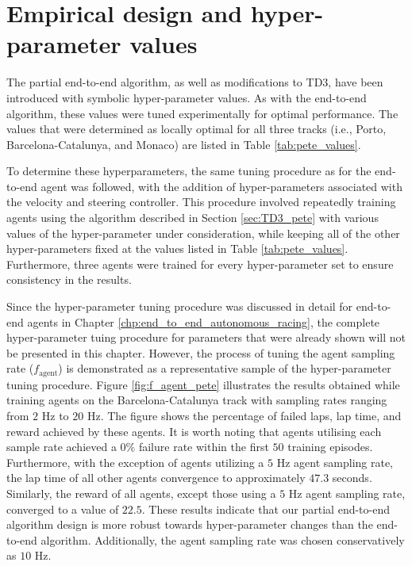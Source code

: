 

\section{Empirical design and hyper-parameter values}

The partial end-to-end algorithm, as well as modifications to TD3, have been introduced with symbolic hyper-parameter values.
As with the end-to-end algorithm, these values were tuned experimentally for optimal performance.
The values that were determined as locally optimal for all three tracks (i.e., Porto, Barcelona-Catalunya, and Monaco) are listed in Table \ref{tab:pete_values}.



To determine these hyperparameters, the same tuning procedure as for the end-to-end agent was followed, 
with the addition of hyper-parameters associated with the velocity and steering controller.
This procedure involved repeatedly training agents using the algorithm described in Section \ref{sec:TD3_pete}
with various values of the hyper-parameter under consideration, while keeping all of the other hyper-parameters fixed at the values listed in Table \ref{tab:pete_values}.
Furthermore, three agents were trained for every hyper-parameter set to ensure consistency in the results.


Since the hyper-parameter tuning procedure was discussed in detail for end-to-end agents in Chapter \ref{chp:end_to_end_autonomous_racing}, the complete hyper-parameter tuing procedure for parameters that were already shown will not be presented in this chapter. 
However, the process of tuning the agent sampling rate ($f_{\text{agent}}$) is demonstrated as a representative sample of the hyper-parameter tuning procedure.
Figure \ref{fig:f_agent_pete} illustrates the results obtained while training agents on the Barcelona-Catalunya track with sampling rates ranging from $2$ Hz to $20$ Hz. 
The figure shows the percentage of failed laps, lap time, and reward achieved by these agents. 
It is worth noting that agents utilising each sample rate achieved a $0\%$ failure rate within the first $50$ training episodes.
Furthermore, with the exception of agents utilizing a $5$ Hz agent sampling rate, the lap time of all other agents convergence to approximately $47.3$ seconds. 
Similarly, the reward of all agents, except those using a $5$ Hz agent sampling rate, converged to a value of $22.5$.
These results indicate that our partial end-to-end algorithm design is more robust towards hyper-parameter changes than the end-to-end algorithm.
Additionally, the agent sampling rate was chosen conservatively as $10$ Hz.

